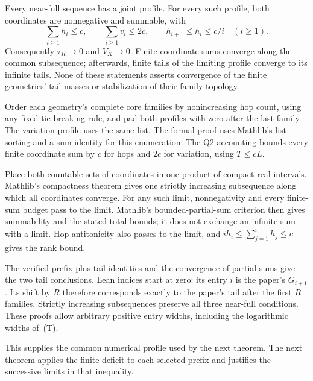 Every near-full sequence has a joint profile. For every such profile,
both coordinates are nonnegative and summable, with
\[
 \sum_{i\ge1}h_i\le c,\qquad \sum_{i\ge1}v_i\le2c,
 \qquad h_{i+1}\le h_i\le c/i\quad(i\ge1).
\]
Consequently $\tau_R\to0$ and $V_K\to0$. Finite coordinate sums converge
along the common subsequence; afterwards, finite tails of the limiting
profile converge to its infinite tails. None of these statements asserts
convergence of the finite geometries' tail masses or stabilization of
their family topology.

\begin{outline}
Order each geometry's complete core families by nonincreasing hop count,
using any fixed tie-breaking rule, and pad both profiles with zero after
the last family. The variation profile uses the same list. The formal
proof uses Mathlib's list sorting and a sum identity for this enumeration.
The Q2 accounting bounds every finite coordinate sum by $c$ for hops and
$2c$ for variation, using $T\le cL$.

Place both countable sets of coordinates in one product of compact real
intervals. Mathlib's compactness theorem gives one strictly increasing
subsequence along which all coordinates converge. For any such limit,
nonnegativity and every finite-sum budget pass to the limit. Mathlib's
bounded-partial-sum criterion then gives summability and the stated total
bounds; it does not exchange an infinite sum with a limit. Hop
antitonicity also passes to the limit, and
$ih_i\le\sum_{j=1}^ih_j\le c$ gives the rank bound.

The verified prefix-plus-tail identities and the convergence of partial
sums give the two tail conclusions. Lean indices start at zero: its
entry $i$ is the paper's $G_{i+1}$. Its shift by $R$ therefore corresponds
exactly to the paper's tail after the first $R$ families. Strictly increasing subsequences
preserve all three near-full conditions. These proofs allow arbitrary
positive entry widths, including the logarithmic widths of~(T).
\end{outline}

This supplies the common numerical profile used by the next theorem.
The next theorem applies the finite deficit to each selected prefix and
justifies the successive limits in that inequality.

